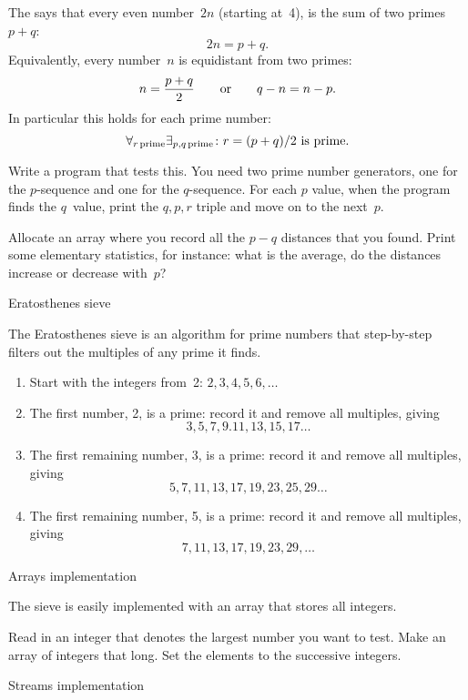 \begin{exercise}
  \label{ex:prime:goldbach-pqr}
  The  says that every even number~$2n$
  (starting at~4), is the sum of two primes $p+q$: \[ 2n=p+q.\]
  Equivalently, every number~$n$ is equidistant from two primes:
  \[ n=\frac{p+q}2\qquad\hbox{or}\qquad q-n = n-p.\]
  In particular this holds for each prime number:
  \[ \forall_{r\,\mathrm{prime}}\exists_{p,q\,\mathrm{prime}}\colon
  \hbox{$r=(p+q)/2$ is prime}. \]

  Write a program that tests this. You need two prime number
  generators, one for the $p$-sequence and one for the $q$-sequence.
  For each $p$ value, 
  when the program finds the $q$~value, print the $q,p,r$ triple and
  move on to the next~$p$.

  Allocate an array where you record all the $p-q$ distances that you
  found. Print some elementary statistics, for instance: what is the average, do the
  distances increase or decrease with~$p$?
\end{exercise}

 {Eratosthenes sieve}

The Eratosthenes sieve is an algorithm for prime numbers that
step-by-step filters out the multiples of any prime it finds.
\begin{enumerate}
\item Start with the integers from~2: $2,3,4,5,6,\ldots$
\item The first number, 2, is a prime: record it and remove all
  multiples, giving
  \[ 3,5,7,9.11,13,15,17\dots \]
\item The first remaining number, 3, is a prime: record it and remove
  all multiples, giving
  \[ 5,7,11,13,17,19,23,25,29\ldots \]
\item The first remaining number, 5, is a prime: record it and remove
  all multiples, giving
  \[ 7,11,13,17,19,23,29,\ldots \]
\end{enumerate}

 {Arrays implementation}
\label{sec:arraysieve}

The sieve is easily implemented with an array that stores all integers.

\begin{exercise}
  Read in an integer that denotes the largest number you want to test.
  Make an array of integers that long. Set the elements to the
  successive integers.
\end{exercise}

 {Streams implementation}
\label{sec:streamsieve}

